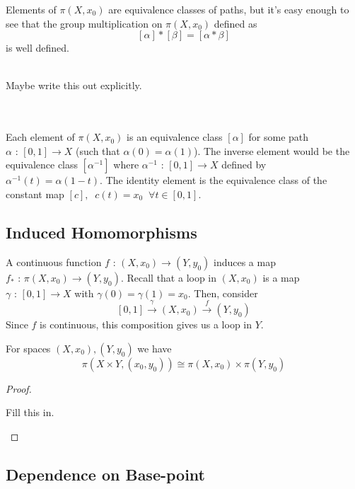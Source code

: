 \documentclass[11pt]{article}
\begin{document}
Elements of $\pi(X, x_0)$ are equivalence classes of paths, but it's easy enough to see that the group multiplication on $\pi(X, x_0)$ defined as $$ [\alpha] * [\beta] = [\alpha * \beta] $$ is well defined.
\\
\\
\begin{note}
  {Maybe write this out explicitly.}
\end{note}
\\
\\
Each element of $\pi(X, x_0)$ is an equivalence class $[\alpha]$ for some path $\alpha \text{ : } [0, 1] \rightarrow X$ (such that $\alpha(0) = \alpha(1)$). The inverse element would be the equivalence class $[\alpha^{-1}]$ where $\alpha^{-1} \text{ : }  [0, 1] \rightarrow X$ defined by $\alpha^{-1}(t) = \alpha(1-t)$. The identity element is the equivalence class of the constant map $[c],\;\; c(t) = x_0\;\; \forall t \in [0, 1]$.

\subsection*{Induced Homomorphisms}
\begin{bluebox}
  A continuous function $f \text{ : } (X, x_0) \rightarrow (Y, y_0)$ induces a map $f_{*} \text{ : } \pi(X, x_0) \rightarrow (Y, y_0)$. Recall that a loop in $(X, x_0)$ is a map $\gamma \text{ : } [0, 1] \rightarrow X$ with $\gamma(0) = \gamma(1) = x_0$. Then, consider $$ [0, 1] \xrightarrow{\gamma} (X, x_0) \xrightarrow{f} (Y, y_0) $$ Since $f$ is continuous, this composition gives us a loop in $Y$.
\end{bluebox}

\begin{theorem}
  For spaces $(X, x_0), (Y, y_0)$ we have $$ \pi(X \times Y, (x_0, y_0)) \cong \pi(X, x_0) \times \pi(Y, y_0) $$
\end{theorem}

\begin{proof}
  \begin{note}
    {Fill this in.}
  \end{note}
\end{proof}

\subsection{Dependence on Base-point}
\end{document}
